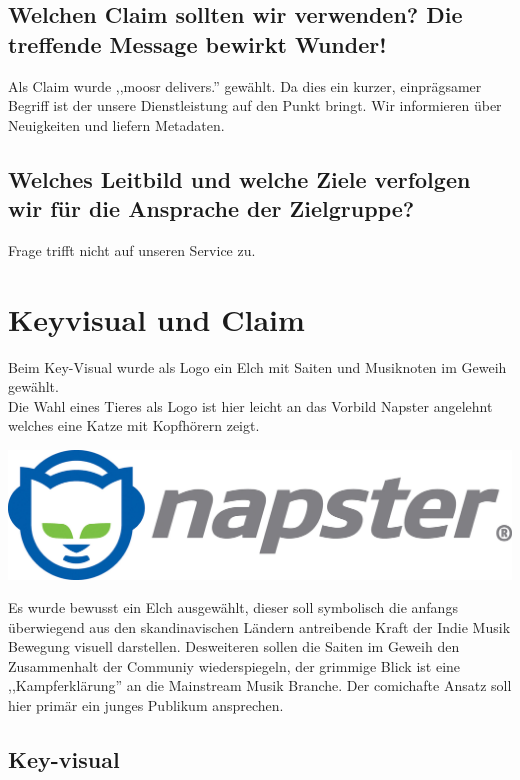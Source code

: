 \documentclass[11pt]{scrreprt}
\begin{document}
\label{claim}\section{Welchen Claim sollten wir verwenden?
Die treffende Message bewirkt Wunder!}

Als Claim wurde ,,moosr delivers.'' gewählt. Da dies ein kurzer, einprägsamer
Begriff ist der unsere Dienstleistung auf den Punkt bringt. Wir informieren über
Neuigkeiten und liefern Metadaten.

\section{Welches Leitbild und welche Ziele verfolgen wir
für die Ansprache der Zielgruppe?}
Frage trifft nicht auf unseren Service zu.


\chapter{Keyvisual und Claim}
Beim Key-Visual wurde als Logo ein Elch mit Saiten und Musiknoten im Geweih
gewählt.
\\
Die Wahl eines Tieres als Logo ist hier leicht an das Vorbild Napster
angelehnt welches eine Katze mit Kopfhörern zeigt.

\begin{center}
    \includegraphics[scale=0.4]{./napster.jpeg}
\end{center}

Es wurde bewusst ein Elch
ausgewählt, dieser soll symbolisch die anfangs überwiegend aus den
skandinavischen Ländern antreibende Kraft der Indie Musik Bewegung visuell
darstellen. Desweiteren sollen die Saiten im Geweih den Zusammenhalt der
Communiy wiederspiegeln, der grimmige Blick ist eine ,,Kampferklärung'' an die
Mainstream Musik Branche. Der comichafte Ansatz soll hier primär ein junges
Publikum ansprechen.
\section{Key-visual}
\end{document}
